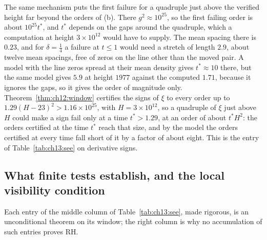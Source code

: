 The same mechanism puts the first failure for a quadruple just above the verified height far beyond the orders of (b). There $g^2\approx10^{25}$, so the first failing order is about $10^{25}t^*$, and $t^*$ depends on the gaps around the quadruple, which a computation at height $3\times10^{12}$ would have to supply. The mean spacing there is $0.23$, and for $\delta=\frac14$ a failure at $t\le1$ would need a stretch of length $2.9$, about twelve mean spacings, free of zeros on the line other than the moved pair. A model with the line zeros spread at their mean density gives $t^*\approx10$ there, but the same model gives $5.9$ at height $1977$ against the computed $1.71$, because it ignores the gaps, so it gives the order of magnitude only. Theorem~\ref{thm:ch12:window} certifies the signs of $\xi$ to every order up to $1.29(H-23)^2>1.16\times10^{25}$, with $H=3\times10^{12}$, so a quadruple of $\xi$ just above $H$ could make a sign fail only at a time $t^*>1.29$, at an order of about $t^*H^2$: the orders certified at the time $t^*$ reach that size, and by the model the orders certified at every time fall short of it by a factor of about eight. This is the entry of Table~\ref{tab:ch13:see} on derivative signs.

\subsection{What finite tests establish, and the local visibility condition}\label{sec:ch13:visibility}

Each entry of the middle column of Table~\ref{tab:ch13:see}, made rigorous, is an unconditional theorem on its window; the right column is why no accumulation of such entries proves RH.

